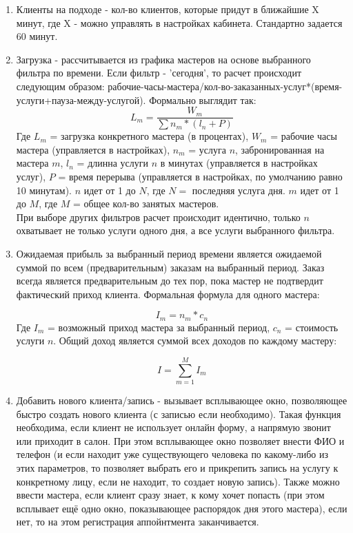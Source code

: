 \documentclass[DIV=calc, paper=a4, fontsize=11pt]{scrartcl} %
\begin{document}
    \begin{enumerate}          
        \item Клиенты на подходе - кол-во клиентов, которые придут в ближайшие X минут, где X - можно управлять в настройках кабинета. Стандартно задается 60 минут.
        \item Загрузка - рассчитывается из графика мастеров на основе выбранного фильтра по времени. Если фильтр - 'сегодня', то расчет происходит следующим образом: рабочие-часы-мастера/кол-во-заказанных-услуг*(время-услуги+пауза-между-услугой). Формально выглядит так: 
            $$
            L_m = \frac{W_m}{\sum n_m * (l_n + P)}
            $$
Где $L_m$ = загрузка конкретного мастера (в процентах), $W_m$ = рабочие часы мастера (управляется в настройках), $n_m$ = услуга $n$, забронированная на мастера $m$, $l_n$ = длинна услуги $n$ в минутах (управляется в настройках услуг), $P$ = время перерыва (управляется в настройках, по умолчанию равно 10 минутам). $n$ идет от 1 до $N$, где $N =$ последняя услуга дня. $m$ идет от 1 до $M$, где $M$ = общее кол-во занятых мастеров.
\\[0.5cm]
При выборе других фильтров расчет происходит идентично, только $n$ охватывает не только услуги одного дня, а все услуги выбранного фильтра.
        \item Ожидаемая прибыль за выбранный период времени является ожидаемой суммой по всем (предварительным) заказам на выбранный период. Заказ всегда является предварительным до тех пор, пока мастер не подтвердит фактический приход клиента. Формальная формула для одного мастера:
            
            $$
            I_m = n_m * c_n
            $$
Где $I_m$ = возможный приход мастера за выбранный период, $c_n$ = стоимость услуги $n$. Общий доход является суммой всех доходов по каждому мастеру:

            $$
            I = \sum_{m=1}^M I_m
            $$

        \item \label{paragraph:add_new_client}Добавить нового клиента/запись - вызывает всплывающее окно, позволяющее быстро создать нового клиента (с записью если необходимо). Такая функция необходима, если клиент не использует онлайн форму, а напрямую звонит или приходит в салон. При этом всплывающее окно позволяет внести ФИО и телефон (и если находит уже существующего человека по какому-либо из этих параметров, то позволяет выбрать его и прикрепить запись на услугу к конкретному лицу, если не находит, то создает новую запись). Также можно ввести мастера, если клиент сразу знает, к кому хочет попасть (при этом всплывает ещё одно окно, показывающее распорядок дня этого мастера), если нет, то на этом регистрация аппойнтмента заканчивается.

    \end{enumerate}
\end{document}
